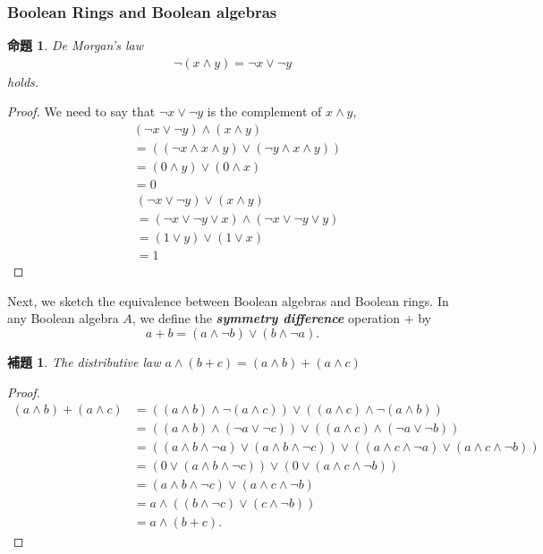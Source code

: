 \documentclass[a4j,12pt]{jarticle}
\numberwithin{equation}{section}
\newcommand{\itbf}[1]{\textit{\textbf{#1}}}
\newtheorem{prop}[thm]{命題}
\newtheorem{lemma}[thm]{補題}
\begin{document}
\subsubsection{Boolean Rings and Boolean algebras}
\begin{prop}
  De Morgan's law
  \begin{align*}
    \neg (x \wedge y) = \neg x \vee \neg y
  \end{align*}
  holds.
\end{prop}
\begin{proof}
  We need to say that $\neg x \vee \neg y$ is the complement of $x \wedge y$,
  \begin{align*}
    & (\neg x \vee \neg y)\wedge (x \wedge y) \\
    &= ((\neg x \wedge x \wedge y) \vee (\neg y \wedge x \wedge y)) \\
    &= (0 \wedge y) \vee (0 \wedge x) \\
    &= 0
  \end{align*}
  \begin{align*}
    & (\neg x \vee \neg y)\vee (x \wedge y) \\
    &= (\neg x \vee \neg y \vee x) \wedge (\neg x \vee \neg y \vee y) \\
    &= (1 \vee y) \vee (1 \vee x) \\
    &= 1
  \end{align*}
\end{proof}
Next, we sketch the equivalence between Boolean algebras and Boolean rings. In any Boolean algebra $A$, we define the \itbf{symmetry difference} operation $+$ by
\begin{equation}
  a + b = (a\wedge \neg b) \vee (b \wedge \neg a).
\end{equation}
\begin{lemma}
  The distributive law $a \wedge (b+c) = (a\wedge b) + (a \wedge c)$
\end{lemma}
\begin{proof}
  \begin{align*}
    (a \wedge b) + (a \wedge c) &= ((a \wedge b) \wedge \neg (a \wedge c)) \vee ((a \wedge c) \wedge \neg (a \wedge b)) \\
                                &= ((a \wedge b) \wedge (\neg a \vee \neg c)) \vee ((a \wedge c) \wedge (\neg a \vee \neg b)) \\
                                &= ((a \wedge b \wedge \neg a) \vee (a \wedge b \wedge \neg c)) \vee ((a \wedge c \wedge \neg a) \vee (a \wedge c \wedge \neg b)) \\
                                &= (0 \vee (a \wedge b \wedge \neg c)) \vee (0 \vee (a \wedge c \wedge \neg b)) \\
                                &= (a \wedge b \wedge \neg c) \vee (a \wedge c \wedge \neg b) \\
                                &= a \wedge ((b \wedge \neg c) \vee (c \wedge \neg b)) \\
                                &= a \wedge (b + c).
  \end{align*}
\end{proof}
\end{document}
